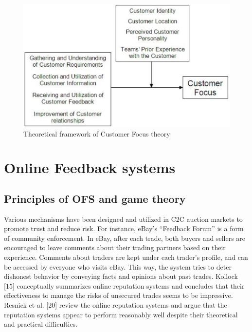 \begin{figure}[t!]
	\centering
	\includegraphics[height=0.3\textheight]{fig01/CustomerFocus}
	\caption{Theoretical framework of Customer Focus theory}
	\label{fig:CustomerFocus}
\end{figure}

\section{Online Feedback systems}
\label{sec:OFS}

\subsection{Principles of OFS and game theory}

Various mechanisms have been designed and utilized
in C2C auction markets to promote trust and reduce risk.
For instance,
eBay's “Feedback Forum” is a form of community enforcement.
In eBay, after each trade, both buyers and
sellers are encouraged to leave comments about their
trading partners based on their experience. Comments
about traders are kept under each trader's profile, and can
be accessed by everyone who visits eBay. This way, the
system tries to deter dishonest behavior by conveying
facts and opinions about past trades. Kollock [15]
conceptually summarizes online reputation systems and
concludes that their effectiveness to manage the risks of
unsecured trades seems to be impressive. Resnick et al.
[20] review the online reputation systems and argue that
the reputation systems appear to perform reasonably well
despite their theoretical and practical difficulties. \cite{yang2007effects}


